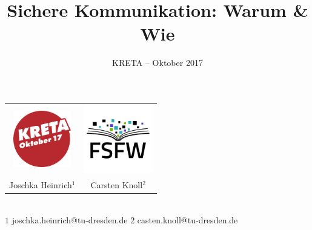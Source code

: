 \documentclass{beamer}
\title{Sichere Kommunikation: Warum \& Wie}
\subtitle{KRETA – Oktober 2017}
\begin{document}
\begin{frame}
  \begin{center}
    \begin{tabularx}{7cm}{cc}
      \includegraphics[width=2.5cm]{img-src/kreta-logo.png}&
      \includegraphics[width=3cm]{img-src/fsfw-logo-with-text.pdf}\\
      Joschka Heinrich${}^{1}$&
      Carsten Knoll${}^{2}$
    \end{tabularx}
    
    \vspace*{2\baselineskip}

    \parbox{.95\columnwidth}{\centering\Large\inserttitle}

    \vspace*{\baselineskip}

    \structure{\large \insertsubtitle}

  \end{center}

  ~\\[5mm]
  {\tiny $1$ joschka.heinrich@tu-dresden.de \qquad $2$ casten.knoll@tu-dresden.de}
\end{frame}


\end{document}
